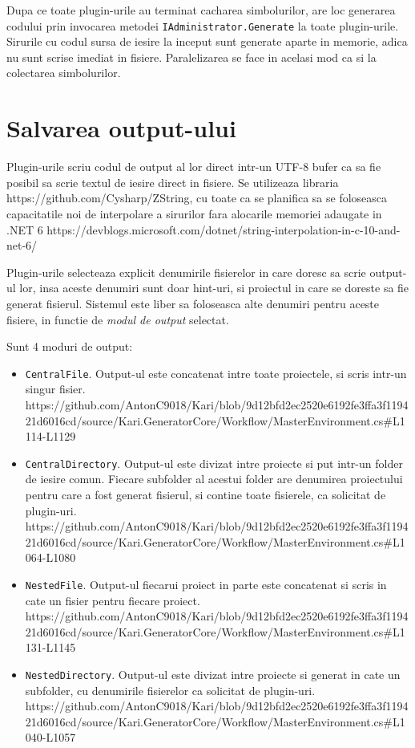 \documentclass{report}
\begin{document}
Dupa ce toate plugin-urile au terminat cacharea simbolurilor, are loc
generarea codului prin invocarea metodei
\texttt{IAdministrator.Generate} la toate plugin-urile. Sirurile cu
codul sursa de iesire la inceput sunt generate aparte in memorie, adica
nu sunt scrise imediat in fisiere. Paralelizarea se face in acelasi mod
ca si la colectarea simbolurilor.

\section{Salvarea output-ului}

Plugin-urile scriu codul de output al lor direct intr-un UTF-8 bufer ca
sa fie posibil sa scrie textul de iesire direct in fisiere. Se
utilizeaza libraria https://github.com/Cysharp/ZString, cu toate ca se
planifica sa se foloseasca capacitatile noi de interpolare a sirurilor
fara alocarile memoriei adaugate in .NET 6
https://devblogs.microsoft.com/dotnet/string-interpolation-in-c-10-and-net-6/

Plugin-urile selecteaza explicit denumirile fisierelor in care doresc sa
scrie output-ul lor, insa aceste denumiri sunt doar hint-uri, si
proiectul in care se doreste sa fie generat fisierul. Sistemul este
liber sa foloseasca alte denumiri pentru aceste fisiere, in functie de
\emph{modul de output} selectat.

Sunt 4 moduri de output:

\begin{itemize}
\item
  \texttt{CentralFile}. Output-ul este concatenat intre toate
  proiectele, si scris intr-un singur fisier.
  https://github.com/AntonC9018/Kari/blob/9d12bfd2ec2520e6192fe3ffa3f119421d6016cd/source/Kari.GeneratorCore/Workflow/MasterEnvironment.cs\#L1114-L1129
\item
  \texttt{CentralDirectory}. Output-ul este divizat intre proiecte si
  put intr-un folder de iesire comun. Fiecare subfolder al acestui
  folder are denumirea proiectului pentru care a fost generat fisierul,
  si contine toate fisierele, ca solicitat de plugin-uri.
  https://github.com/AntonC9018/Kari/blob/9d12bfd2ec2520e6192fe3ffa3f119421d6016cd/source/Kari.GeneratorCore/Workflow/MasterEnvironment.cs\#L1064-L1080
\item
  \texttt{NestedFile}. Output-ul fiecarui proiect in parte este
  concatenat si scris in cate un fisier pentru fiecare proiect.
  https://github.com/AntonC9018/Kari/blob/9d12bfd2ec2520e6192fe3ffa3f119421d6016cd/source/Kari.GeneratorCore/Workflow/MasterEnvironment.cs\#L1131-L1145
\item
  \texttt{NestedDirectory}. Output-ul este divizat intre proiecte si
  generat in cate un subfolder, cu denumirile fisierelor ca solicitat de
  plugin-uri.
  https://github.com/AntonC9018/Kari/blob/9d12bfd2ec2520e6192fe3ffa3f119421d6016cd/source/Kari.GeneratorCore/Workflow/MasterEnvironment.cs\#L1040-L1057
\end{itemize}
\end{document}
